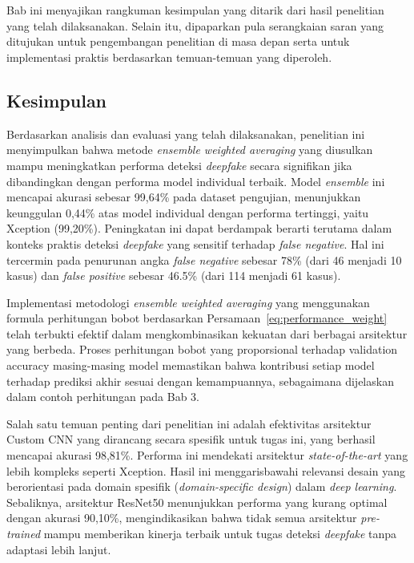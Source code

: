\chapter{\babLima}

Bab ini menyajikan rangkuman kesimpulan yang ditarik dari hasil penelitian yang telah dilaksanakan. Selain itu, dipaparkan pula serangkaian saran yang ditujukan untuk pengembangan penelitian di masa depan serta untuk implementasi praktis berdasarkan temuan-temuan yang diperoleh.

\section{Kesimpulan}

Berdasarkan analisis dan evaluasi yang telah dilaksanakan, penelitian ini menyimpulkan bahwa metode \textit{ensemble weighted averaging} yang diusulkan mampu meningkatkan performa deteksi \textit{deepfake} secara signifikan jika dibandingkan dengan performa model individual terbaik. Model \textit{ensemble} ini mencapai akurasi sebesar 99,64\% pada dataset pengujian, menunjukkan keunggulan 0,44\% atas model individual dengan performa tertinggi, yaitu Xception (99,20\%). Peningkatan ini dapat berdampak berarti terutama dalam konteks praktis deteksi \textit{deepfake} yang sensitif terhadap \textit{false negative}. Hal ini tercermin pada penurunan angka \textit{false negative} sebesar 78\% (dari 46 menjadi 10 kasus) dan \textit{false positive} sebesar 46.5\% (dari 114 menjadi 61 kasus).

Implementasi metodologi \textit{ensemble weighted averaging} yang menggunakan formula perhitungan bobot berdasarkan Persamaan~\ref{eq:performance_weight} telah terbukti efektif dalam mengkombinasikan kekuatan dari berbagai arsitektur yang berbeda. Proses perhitungan bobot yang proporsional terhadap validation accuracy masing-masing model memastikan bahwa kontribusi setiap model terhadap prediksi akhir sesuai dengan kemampuannya, sebagaimana dijelaskan dalam contoh perhitungan pada Bab 3.

Salah satu temuan penting dari penelitian ini adalah efektivitas arsitektur Custom CNN yang dirancang secara spesifik untuk tugas ini, yang berhasil mencapai akurasi 98,81\%. Performa ini mendekati arsitektur \textit{state-of-the-art} yang lebih kompleks seperti Xception. Hasil ini menggarisbawahi relevansi desain yang berorientasi pada domain spesifik (\textit{domain-specific design}) dalam \textit{deep learning}. Sebaliknya, arsitektur ResNet50 menunjukkan performa yang kurang optimal dengan akurasi 90,10\%, mengindikasikan bahwa tidak semua arsitektur \textit{pre-trained} mampu memberikan kinerja terbaik untuk tugas deteksi \textit{deepfake} tanpa adaptasi lebih lanjut.

